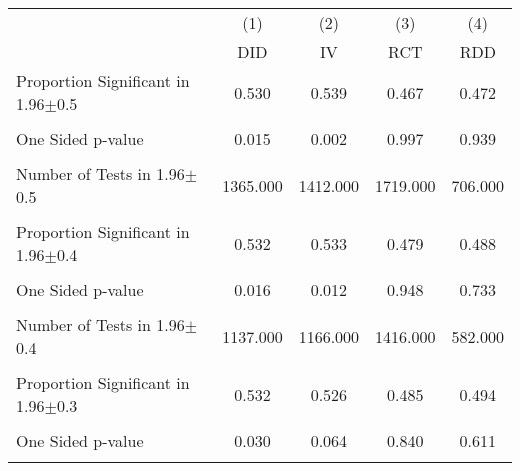 {
\def\sym#1{\ifmmode^{#1}\else\(^{#1}\)\fi}
\begin{tabular}{l*{4}{c}}
\hline\hline
                &\multicolumn{1}{c}{(1)}&\multicolumn{1}{c}{(2)}&\multicolumn{1}{c}{(3)}&\multicolumn{1}{c}{(4)}\\
                &\multicolumn{1}{c}{DID}&\multicolumn{1}{c}{IV}&\multicolumn{1}{c}{RCT}&\multicolumn{1}{c}{RDD}\\
\hline
\hline Proportion Significant in 1.96$\pm$0.5&    0.530         &    0.539         &    0.467         &    0.472         \\
                &                  &                  &                  &                  \\
One Sided p-value&    0.015         &    0.002         &    0.997         &    0.939         \\
                &                  &                  &                  &                  \\
Number of Tests in 1.96$\pm$0.5& 1365.000         & 1412.000         & 1719.000         &  706.000         \\
                &                  &                  &                  &                  \\
\hline Proportion Significant in 1.96$\pm$0.4&    0.532         &    0.533         &    0.479         &    0.488         \\
                &                  &                  &                  &                  \\
One Sided p-value&    0.016         &    0.012         &    0.948         &    0.733         \\
                &                  &                  &                  &                  \\
Number of Tests in 1.96$\pm$0.4& 1137.000         & 1166.000         & 1416.000         &  582.000         \\
                &                  &                  &                  &                  \\
\hline Proportion Significant in 1.96$\pm$0.3&    0.532         &    0.526         &    0.485         &    0.494         \\
                &                  &                  &                  &                  \\
One Sided p-value&    0.030         &    0.064         &    0.840         &    0.611         \\
                &                  &                  &                  &                  \\

\end{tabular}}
